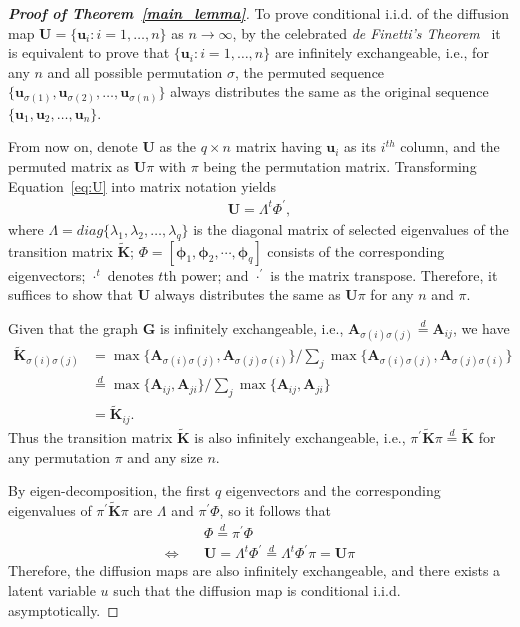 \documentclass[11pt]{article}
\theoremstyle{definition}
\begin{document}
\begin{proof}[\textbf{Proof of Theorem~\ref{main_lemma}}]
To prove conditional i.i.d. of the diffusion map $\mathbf{U} = \{\mathbf{u}_i : i=1,\ldots,n\}$ as $n \rightarrow \infty$, by the celebrated \textit{de Finetti's Theorem}~\cite{diaconis1980finite,orbanz2015bayesian} it is equivalent to prove that $\{ \mathbf{u}_i : i=1,\ldots,n \}$ are infinitely exchangeable, i.e., for any $n$ and all possible permutation $\sigma$, the permuted sequence $\{\mathbf{u}_{\sigma(1)}, \mathbf{u}_{\sigma(2)}, \ldots,\mathbf{u}_{\sigma(n)}\}$ always distributes the same as the original sequence $\{\mathbf{u}_{1}, \mathbf{u}_{2}, \ldots,\mathbf{u}_{n}\}$.

From now on, denote $\mathbf{U}$ as the $q \times n$ matrix having $\mathbf{u}_i$ as its $i^{th}$ column, and the permuted matrix as $\mathbf{U} \pi$ with $\pi$ being the permutation matrix. Transforming Equation~\ref{eq:U} into matrix notation yields
\begin{align*}
\mathbf{U}=\Lambda^{t}\Phi^{'},
\end{align*}
where $\Lambda=diag\{ \lambda_{1},\lambda_2,\ldots,\lambda_q \}$ is the diagonal matrix of selected eigenvalues of the transition matrix $\mathbf{\widetilde{K}}$; $\Phi =[ \mathbf{\phi}_1, \mathbf{\phi}_2,\cdots, \mathbf{\phi}_q ]$ consists of the corresponding eigenvectors; $\cdot^{t}$ denotes $t$th power; and $\cdot^{'}$ is the matrix transpose. Therefore, it suffices to show that $\mathbf{U}$ always distributes the same as $\mathbf{U} \pi$ for any $n$ and $\pi$.

Given that the graph $\mathbf{G}$ is infinitely exchangeable, i.e., $\mathbf{A}_{\sigma(i)\sigma(j)} \stackrel{d}{=} \mathbf{A}_{ij}$, we have
\begin{align*}
\mathbf{\widetilde{K}}_{\sigma(i) \sigma(j)} &= \max\{\mathbf{A}_{\sigma(i) \sigma(j)},\mathbf{A}_{\sigma(j) \sigma(i)}\} / \sum\limits_{j} \max\{\mathbf{A}_{\sigma(i) \sigma(j)},\mathbf{A}_{\sigma(j) \sigma(i)}\} \\
 &\stackrel{d}{=} \max\{\mathbf{A}_{ij},\mathbf{A}_{ji}\} / \sum\limits_{j} \max\{\mathbf{A}_{ij},\mathbf{A}_{ji}\} \\
&= \mathbf{\widetilde{K}}_{ij}.
\end{align*}
Thus the transition matrix $\mathbf{\widetilde{K}}$ is also infinitely exchangeable, i.e., $\pi^{'} \mathbf{\widetilde{K}} \pi \stackrel{d}{=} \mathbf{\widetilde{K}}$ for any permutation $\pi$ and any size $n$. 

By eigen-decomposition, the first $q$ eigenvectors and the corresponding eigenvalues of $\pi^{'} \mathbf{\widetilde{K}} \pi$ are $\Lambda$ and $\pi^{'} \Phi$, so it follows that
\begin{align*}
	& \Phi \stackrel{d}{=} \pi^{'} \Phi\\
        \Leftrightarrow \quad
        & \mathbf{U}=\Lambda^{t} \Phi^{'}  \stackrel{d}{=} \Lambda^{t} \Phi^{'} \pi = \mathbf{U} \pi 
\end{align*}	
Therefore, the diffusion maps are also infinitely exchangeable, and there exists a latent variable $u$ such that the diffusion map is conditional i.i.d. asymptotically. 
\end{proof}
\end{document}
